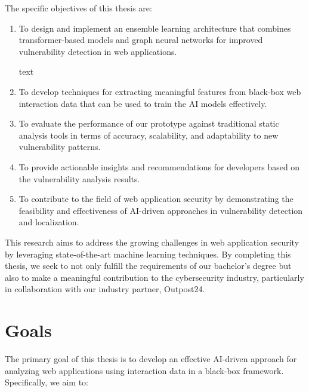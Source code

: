The specific objectives of this thesis are:

\begin{enumerate}
\item To design and implement an ensemble learning architecture that combines transformer-based models and graph neural networks for improved vulnerability detection in web applications.

text
\item To develop techniques for extracting meaningful features from black-box web interaction data that can be used to train the AI models effectively.

\item To evaluate the performance of our prototype against traditional static analysis tools in terms of accuracy, scalability, and adaptability to new vulnerability patterns.

\item To provide actionable insights and recommendations for developers based on the vulnerability analysis results.

\item To contribute to the field of web application security by demonstrating the feasibility and effectiveness of AI-driven approaches in vulnerability detection and localization.
\end{enumerate}

This research aims to address the growing challenges in web application security by leveraging state-of-the-art machine learning techniques. By completing this thesis, we seek to not only fulfill the requirements of our bachelor's degree but also to make a meaningful contribution to the cybersecurity industry, particularly in collaboration with our industry partner, Outpost24.

\section{Goals}
The primary goal of this thesis is to develop an effective AI-driven approach for analyzing web applications using interaction data in a black-box framework. Specifically, we aim to:


